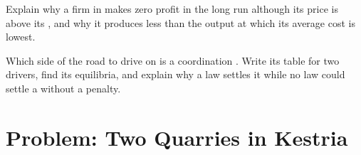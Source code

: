 \begin{exercise}[$\star\star\star$]\label{exo:g11:oligopoly-and-games:14}
Explain why a firm in  makes zero profit in the long run although its price is above its , and why it produces less than the output at
which its average cost is lowest.
\end{exercise}

\begin{exercise}[$\star\star\star$]\label{exo:g11:oligopoly-and-games:15}
Which side of the road to drive on is a coordination . Write its  table for two drivers, find its equilibria, and explain why a law settles it while no law could
settle a  without a penalty.
\end{exercise}

\section{Problem: Two Quarries in Kestria}

